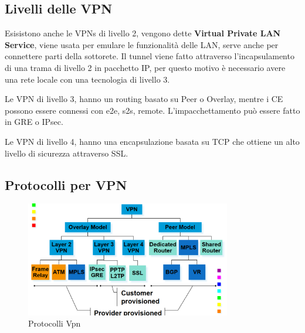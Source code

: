 \documentclass[12pt]{article}
\begin{document}
\subsection{Livelli delle VPN}
Esisistono anche le VPNs di livello 2, vengono dette \textbf{Virtual Private LAN Service}, viene usata per emulare le funzionalit\`a delle LAN, serve anche per connettere parti della sottorete. Il tunnel viene fatto attraverso l'incapsulamento di una trama di livello 2 in pacchetto IP, per questo motivo \`e necessario avere una rete locale con una tecnologia di livello 3.

Le VPN di livello 3, hanno un routing basato su Peer o Overlay, mentre i CE possono essere connessi con e2e, s2s, remote. L'impacchettamento pu\`o essere fatto in GRE o IPsec.

Le VPN di livello 4, hanno una encapsulazione basata su TCP che ottiene un alto livello di sicurezza attraverso SSL.


\subsection{Protocolli per VPN}
\begin{figure}[H]
    \centering
    \includegraphics[width=0.8\textwidth]{protocolli-vpn.png}
    \caption{Protocolli Vpn}
    \label{fig:protocolli-vpn}
\end{figure}
\end{document}
